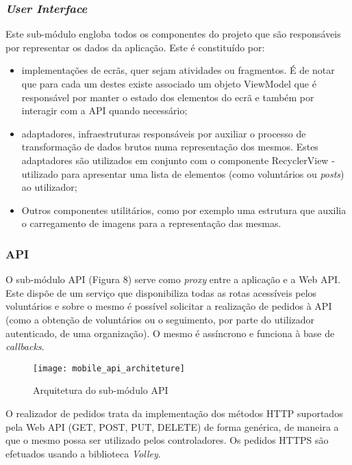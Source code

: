 \subsubsection{\textit{User Interface}}

Este sub-módulo engloba todos os componentes do projeto que são responsáveis por representar os dados da aplicação. Este é constituído por:

\begin{itemize}
	\item implementações de ecrãs, quer sejam atividades ou fragmentos. É de notar que para cada um destes existe associado um objeto ViewModel que é responsável por manter o estado dos elementos do ecrã e também por interagir com a API quando necessário; 
	\item adaptadores, infraestruturas responsáveis por auxiliar o processo de transformação de dados brutos numa representação dos mesmos. Estes adaptadores são utilizados em conjunto com o componente RecyclerView - utilizado para apresentar uma lista de elementos (como voluntários ou \textit{posts}) ao utilizador;
	\item Outros componentes utilitários, como por exemplo uma estrutura que auxilia o carregamento de imagens para a representação das mesmas.
\end{itemize} 

\subsubsection{API}

O sub-módulo API (Figura 8) serve como \textit{proxy} entre a aplicação e a Web API. Este dispõe de um serviço que disponibiliza todas as rotas acessíveis pelos voluntários e sobre o mesmo é possível solicitar a realização de pedidos à API (como a obtenção de voluntários ou o seguimento, por parte do utilizador autenticado, de uma organização). O mesmo é assíncrono e funciona à base de \textit{callbacks}.

\begin{figure}[h]
	\centering
	\texttt{[image: mobile\_api\_architeture]}
	\caption{Arquitetura do sub-módulo API}
\end{figure}

O realizador de pedidos trata da implementação dos métodos HTTP suportados pela Web API (GET, POST, PUT, DELETE) de forma genérica, de maneira a que o mesmo possa ser utilizado pelos controladores. Os pedidos HTTPS são efetuados usando a biblioteca \textit{Volley}.

